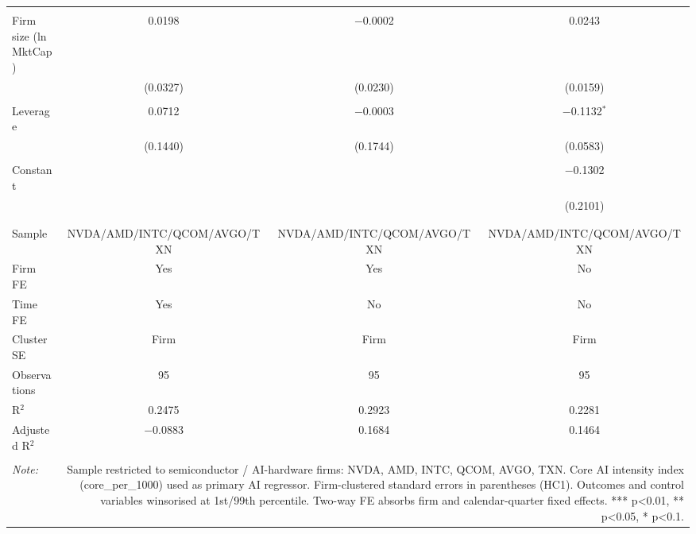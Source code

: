\begin{table}[!htbp]
\begin{tabular}{@{\extracolsep{5pt}}lccc}
  & & & \\ 
 Firm size (ln MktCap) & 0.0198 & $-$0.0002 & 0.0243 \\ 
  & (0.0327) & (0.0230) & (0.0159) \\ 
  & & & \\ 
 Leverage & 0.0712 & $-$0.0003 & $-$0.1132$^{*}$ \\ 
  & (0.1440) & (0.1744) & (0.0583) \\ 
  & & & \\ 
 Constant &  &  & $-$0.1302 \\ 
  &  &  & (0.2101) \\ 
  & & & \\ 
\hline \\[-1.8ex] 
Sample & NVDA/AMD/INTC/QCOM/AVGO/TXN & NVDA/AMD/INTC/QCOM/AVGO/TXN & NVDA/AMD/INTC/QCOM/AVGO/TXN \\ 
Firm FE & Yes & Yes & No \\ 
Time FE & Yes & No & No \\ 
Cluster SE & Firm & Firm & Firm \\ 
Observations & 95 & 95 & 95 \\ 
R$^{2}$ & 0.2475 & 0.2923 & 0.2281 \\ 
Adjusted R$^{2}$ & $-$0.0883 & 0.1684 & 0.1464 \\ 
\hline 
\hline \\[-1.8ex] 
\textit{Note:}  & \multicolumn{3}{r}{Sample restricted to semiconductor / AI-hardware firms: NVDA, AMD, INTC, QCOM, AVGO, TXN. Core AI intensity index (core_per_1000) used as primary AI regressor. Firm-clustered standard errors in parentheses (HC1). Outcomes and control variables winsorised at 1st/99th percentile. Two-way FE absorbs firm and calendar-quarter fixed effects. *** p<0.01, ** p<0.05, * p<0.1.} \\ 
\end{tabular} 
\end{table} 
